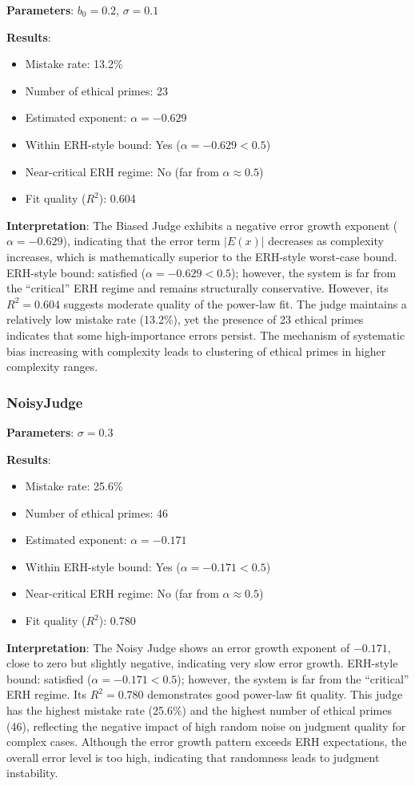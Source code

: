 \documentclass[12pt,a4paper]{article}
\theoremstyle{definition}
\theoremstyle{remark}
\begin{document}
\textbf{Parameters}: $b_0 = 0.2$, $\sigma = 0.1$

\textbf{Results}:
\begin{itemize}
    \item Mistake rate: 13.2\%
    \item Number of ethical primes: 23
    \item Estimated exponent: $\alpha = -0.629$
    \item Within ERH-style bound: Yes ($\alpha = -0.629 < 0.5$)
    \item Near-critical ERH regime: No (far from $\alpha \approx 0.5$)
    \item Fit quality ($R^2$): 0.604
\end{itemize}

\textbf{Interpretation}: The Biased Judge exhibits a negative error growth exponent ($\alpha = -0.629$), indicating that the error term $|E(x)|$ decreases as complexity increases, which is mathematically superior to the ERH-style worst-case bound. ERH-style bound: satisfied ($\alpha = -0.629 < 0.5$); however, the system is far from the ``critical'' ERH regime and remains structurally conservative. However, its $R^2 = 0.604$ suggests moderate quality of the power-law fit. The judge maintains a relatively low mistake rate (13.2\%), yet the presence of 23 ethical primes indicates that some high-importance errors persist. The mechanism of systematic bias increasing with complexity leads to clustering of ethical primes in higher complexity ranges.

\subsubsection{NoisyJudge}

\textbf{Parameters}: $\sigma = 0.3$

\textbf{Results}:
\begin{itemize}
    \item Mistake rate: 25.6\%
    \item Number of ethical primes: 46
    \item Estimated exponent: $\alpha = -0.171$
    \item Within ERH-style bound: Yes ($\alpha = -0.171 < 0.5$)
    \item Near-critical ERH regime: No (far from $\alpha \approx 0.5$)
    \item Fit quality ($R^2$): 0.780
\end{itemize}

\textbf{Interpretation}: The Noisy Judge shows an error growth exponent of $-0.171$, close to zero but slightly negative, indicating very slow error growth. ERH-style bound: satisfied ($\alpha = -0.171 < 0.5$); however, the system is far from the ``critical'' ERH regime. Its $R^2 = 0.780$ demonstrates good power-law fit quality. This judge has the highest mistake rate (25.6\%) and the highest number of ethical primes (46), reflecting the negative impact of high random noise on judgment quality for complex cases. Although the error growth pattern exceeds ERH expectations, the overall error level is too high, indicating that randomness leads to judgment instability.
\end{document}
